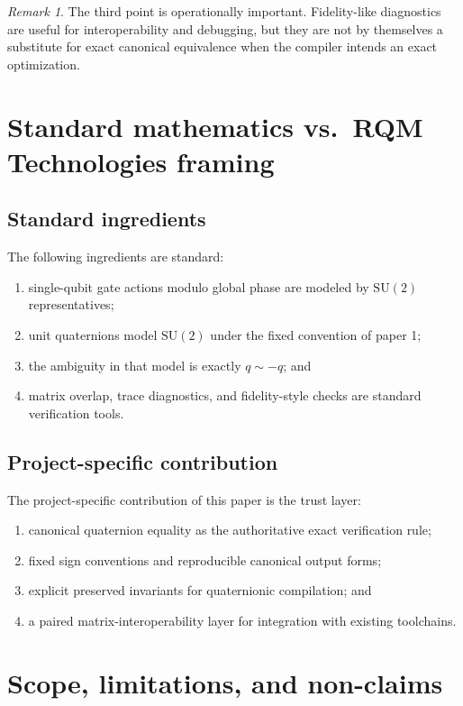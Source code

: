 \documentclass[11pt]{article}
\theoremstyle{remark}
\newtheorem{remark}[definition]{Remark}
\newcommand{\SU}{\mathrm{SU}}
\begin{document}
\begin{remark}
The third point is operationally important. Fidelity-like diagnostics are useful
for interoperability and debugging, but they are not by themselves a substitute
for exact canonical equivalence when the compiler intends an exact optimization.
\end{remark}

\section{Standard mathematics vs.\ RQM Technologies framing}

\subsection{Standard ingredients}

The following ingredients are standard:
\begin{enumerate}[label=(\arabic*), leftmargin=1.5em]
\item single-qubit gate actions modulo global phase are modeled by $\SU(2)$
representatives;
\item unit quaternions model $\SU(2)$ under the fixed convention of paper 1;
\item the ambiguity in that model is exactly $q\sim -q$; and
\item matrix overlap, trace diagnostics, and fidelity-style checks are standard
verification tools.
\end{enumerate}

\subsection{Project-specific contribution}

The project-specific contribution of this paper is the trust layer:
\begin{enumerate}[label=(\alph*), leftmargin=1.5em]
\item canonical quaternion equality as the authoritative exact verification rule;
\item fixed sign conventions and reproducible canonical output forms;
\item explicit preserved invariants for quaternionic compilation; and
\item a paired matrix-interoperability layer for integration with existing
toolchains.
\end{enumerate}

\section{Scope, limitations, and non-claims}
\end{document}
